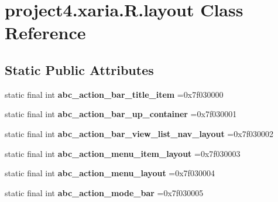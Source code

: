 \hypertarget{classproject4_1_1xaria_1_1R_1_1layout}{}\section{project4.\+xaria.\+R.\+layout Class Reference}
\label{classproject4_1_1xaria_1_1R_1_1layout}
\subsection*{Static Public Attributes}
\begin{DoxyCompactItemize}
\item 
\mbox{\label{classproject4_1_1xaria_1_1R_1_1layout_affe908506650d9fc044f245420fedcdc}} 
static final int {\bfseries abc\+\_\+action\+\_\+bar\+\_\+title\+\_\+item} =0x7f030000
\item 
\mbox{\label{classproject4_1_1xaria_1_1R_1_1layout_a48f14cd7c6d8db018f004af8dce33261}} 
static final int {\bfseries abc\+\_\+action\+\_\+bar\+\_\+up\+\_\+container} =0x7f030001
\item 
\mbox{\label{classproject4_1_1xaria_1_1R_1_1layout_a5bc9dc9b8ff2c37fac56bb4c849f2acc}} 
static final int {\bfseries abc\+\_\+action\+\_\+bar\+\_\+view\+\_\+list\+\_\+nav\+\_\+layout} =0x7f030002
\item 
\mbox{\label{classproject4_1_1xaria_1_1R_1_1layout_ac637c2b850588e8c0eaae11dcb04798f}} 
static final int {\bfseries abc\+\_\+action\+\_\+menu\+\_\+item\+\_\+layout} =0x7f030003
\item 
\mbox{\label{classproject4_1_1xaria_1_1R_1_1layout_a2290f144d81e0a4658d4e6ae37214a5f}} 
static final int {\bfseries abc\+\_\+action\+\_\+menu\+\_\+layout} =0x7f030004
\item 
\mbox{\label{classproject4_1_1xaria_1_1R_1_1layout_a1157016190d29aad88eb2c31a0446618}} 
static final int {\bfseries abc\+\_\+action\+\_\+mode\+\_\+bar} =0x7f030005
\item 
\mbox{\label{classproject4_1_1xaria_1_1R_1_1layout_af84524f27598993b5e4d229738751a53}} 

\end{DoxyCompactItemize}
